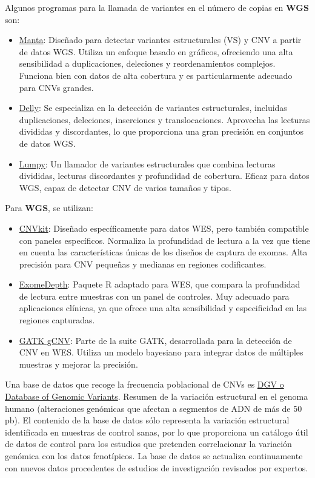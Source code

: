 Algunos programas para la llamada de variantes en el número de copias en \textbf{WGS} son:
\begin{itemize}
\item \href{https://github.com/Illumina/manta}{Manta}: Diseñado para detectar variantes estructurales (VS) y CNV a partir de datos WGS. Utiliza un enfoque basado en gráficos, ofreciendo una alta sensibilidad a duplicaciones, deleciones y reordenamientos complejos. Funciona bien con datos de alta cobertura y es particularmente adecuado para CNVs grandes.
\item \href{https://github.com/dellytools/delly}{Delly}: Se especializa en la detección de variantes estructurales, incluidas duplicaciones, deleciones, inserciones y translocaciones. Aprovecha las lecturas divididas y discordantes, lo que proporciona una gran precisión en conjuntos de datos WGS.
\item \href{https://genomebiology.biomedcentral.com/articles/10.1186/gb-2014-15-6-r84}{Lumpy}: Un llamador de variantes estructurales que combina lecturas divididas, lecturas discordantes y profundidad de cobertura. Eficaz para datos WGS, capaz de detectar CNV de varios tamaños y tipos.
\end{itemize}

Para \textbf{WGS}, se utilizan:
\begin{itemize}
\item \href{https://cnvkit.readthedocs.io/en/stable/}{CNVkit}: Diseñado específicamente para datos WES, pero también compatible con paneles específicos. Normaliza la profundidad de lectura a la vez que tiene en cuenta las características únicas de los diseños de captura de exomas. Alta precisión para CNV pequeñas y medianas en regiones codificantes.
\item \href{https://github.com/vplagnol/ExomeDepth}{ExomeDepth}: Paquete R adaptado para WES, que compara la profundidad de lectura entre muestras con un panel de controles. Muy adecuado para aplicaciones clínicas, ya que ofrece una alta sensibilidad y especificidad en las regiones capturadas.
\item \href{https://www.nature.com/articles/s41588-023-01449-0}{GATK gCNV}: Parte de la suite GATK, desarrollada para la detección de CNV en WES. Utiliza un modelo bayesiano para integrar datos de múltiples muestras y mejorar la precisión.
\end{itemize}

Una base de datos que recoge la frecuencia poblacional de CNVs es \href{https://dgv.tcag.ca/dgv/app/about}{DGV o Database of Genomic Variants}. Resumen de la variación estructural en el genoma humano (alteraciones genómicas que afectan a segmentos de ADN de más de 50 pb). El contenido de la base de datos sólo representa la variación estructural identificada en muestras de control sanas, por lo que proporciona un catálogo útil de datos de control para los estudios que pretenden correlacionar la variación genómica con los datos fenotípicos. La base de datos se actualiza continuamente con nuevos datos procedentes de estudios de investigación revisados por expertos.

